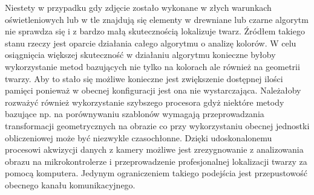 Niestety w przypadku gdy zdjęcie zostało wykonane w złych warunkach
oświetleniowych lub w tle znajdują się elementy w drewniane lub czarne algorytm
nie sprawdza się i z bardzo małą skutecznością lokalizuje twarz. Źródłem takiego
stanu rzeczy jest oparcie działania całego algorytmu o analizę kolorów. W
celu osiągnięcia większej skuteczność w działaniu algorytmu konieczne byłoby
wykorzystanie metod bazujących nie tylko na kolorach ale również na geometrii
twarzy. Aby to stało się możliwe konieczne jest zwiększenie dostępnej ilości
pamięci ponieważ w obecnej konfiguracji jest ona nie wystarczająca. Należałoby
rozważyć również wykorzystanie szybszego procesora gdyż niektóre metody bazujące
np. na porównywaniu szablonów wymagają przeprowadzania transformacji
geometrycznych na obrazie co przy wykorzystaniu obecnej jednostki obliczeniowej
może być niezwykle czasochłonne. 
Dzięki udoskonalonemu procesowi akwizycji danych z kamery możliwe jest
zrezygnowanie z analizowania obrazu na mikrokontrolerze i przeprowadzenie
profesjonalnej lokalizacji twarzy za pomocą komputera. Jedynym
ograniczeniem takiego podejścia jest przepustowość obecnego kanału
komunikacyjnego. 
